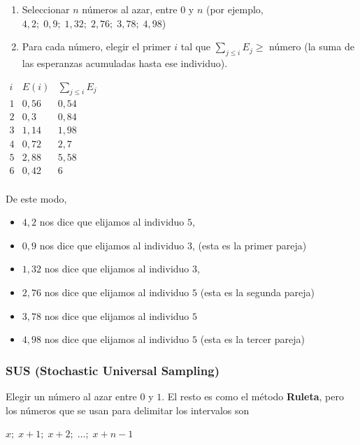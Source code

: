 \documentclass[10pt,a4paper]{article}
\begin{document}
\begin{enumerate}

	\item Seleccionar $n$ números al azar, entre $0$ y $n$ (por ejemplo, $4,2;\; 0,9;\;1,32;\;2,76;\;3,78;\;4,98$)
	\item Para cada número, elegir el primer $i$ tal que $\sum\limits_{j\leq i}E_j \geq$ número (la suma de las esperanzas acumuladas hasta ese individuo).
\end{enumerate}

\begin{center}
$\begin{array}{c|r|r} i & E(i) &\sum\limits_{j\leq i}E_j\\ \hline 1 &0,56 & 0,54\\ 2 & 0,3 & 0,84\\ 3 & 1,14 & 1,98\\ 4 & 0,72 & 2,7\\ 5& 2,88 &5,58\\ 6& 0,42& 6\\ \end{array}$
\end{center}

De este modo,

\begin{itemize}

	\item $4,2$ nos dice que elijamos al individuo $5$,
	\item $0,9$ nos dice que elijamos al individuo $3$, (esta es la primer pareja)
	\item $1,32$ nos dice que elijamos al individuo $3 $,
	\item $2,76$ nos dice que elijamos al individuo $5$ (esta es la segunda pareja)
	\item $3,78$ nos dice que elijamos al individuo $5$
	\item $4,98$ nos dice que elijamos al individuo $5$ (esta es la tercer pareja)
\end{itemize}

\subsubsection*{SUS (Stochastic Universal Sampling)}

Elegir un número al azar entre $0$ y $1$. El resto es como el método \textbf{Ruleta}, pero los números que se usan para delimitar los intervalos son

\begin{center}
$x;\;x+1;\;x+2;\;\dots ;\; x+n-1$
\end{center}
\end{document}
